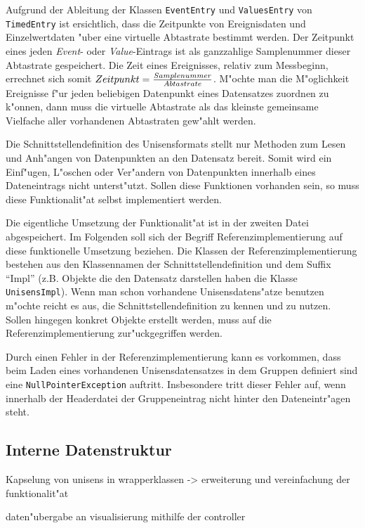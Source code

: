 Aufgrund der Ableitung der Klassen \verb|EventEntry| und \verb|ValuesEntry| von \verb|TimedEntry| ist ersichtlich, dass die Zeitpunkte von Ereignisdaten und Einzelwertdaten "uber eine virtuelle Abtastrate bestimmt werden.
Der Zeitpunkt eines jeden \emph{Event}- oder \emph{Value}-Eintrags ist als ganzzahlige Samplenummer dieser Abtastrate gespeichert.
Die Zeit eines Ereignisses, relativ zum Messbeginn, errechnet sich somit $Zeitpunkt = {Samplenummer \over Abtastrate}$.
M"ochte man die M"oglichkeit Ereignisse f"ur jeden beliebigen Datenpunkt eines Datensatzes zuordnen zu k"onnen, dann muss die virtuelle Abtastrate als das kleinste gemeinsame Vielfache aller vorhandenen Abtastraten gew"ahlt werden.

Die Schnittstellendefinition des Unisensformats stellt nur Methoden zum Lesen und Anh"angen von Datenpunkten an den Datensatz bereit.
Somit wird ein Einf"ugen, L"oschen oder Ver"andern von Datenpunkten innerhalb eines Dateneintrags nicht unterst"utzt.
Sollen diese Funktionen vorhanden sein, so muss diese Funktionalit"at selbst implementiert werden.

Die eigentliche Umsetzung der Funktionalit"at ist in der zweiten Datei abgespeichert.
Im Folgenden soll sich der Begriff Referenzimplementierung auf diese funktionelle Umsetzung beziehen.
Die Klassen der Referenzimplementierung bestehen aus den Klassennamen der Schnittstellendefinition und dem Suffix "`Impl"' (z.B. Objekte die den Datensatz darstellen haben die Klasse \verb|UnisensImpl|).
Wenn man schon vorhandene Unisensdatens"atze benutzen m"ochte reicht es aus, die Schnittstellendefinition zu kennen und zu nutzen.
Sollen hingegen konkret Objekte erstellt werden, muss auf die Referenzimplementierung zur"uckgegriffen werden.

Durch einen Fehler in der Referenzimplementierung kann es vorkommen, dass beim Laden eines vorhandenen Unisensdatensatzes in dem Gruppen definiert sind eine \verb|NullPointerException| auftritt.
Insbesondere tritt dieser Fehler auf, wenn innerhalb der Headerdatei der Gruppeneintrag nicht hinter den Dateneintr"agen steht.

\subsection{Interne Datenstruktur}

Kapselung von unisens in wrapperklassen -> erweiterung und vereinfachung der funktionalit"at

daten"ubergabe an visualisierung mithilfe der controller

